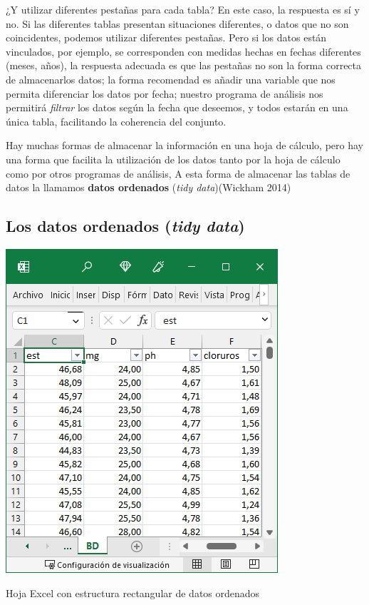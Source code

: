 \documentclass[
  letterpaper,
]{scrbook}
\begin{document}
¿Y utilizar diferentes pestañas para cada tabla? En este caso, la
respuesta es sí y no. Si las diferentes tablas presentan situaciones
diferentes, o datos que no son coincidentes, podemos utilizar diferentes
pestañas. Pero si los datos están vinculados, por ejemplo, se
corresponden con medidas hechas en fechas diferentes (meses, años), la
respuesta adecuada es que las pestañas no son la forma correcta de
almacenarlos datos; la forma recomendad es añadir una variable que nos
permita diferenciar los datos por fecha; nuestro programa de análisis
nos permitirá \emph{filtrar} los datos según la fecha que deseemos, y
todos estarán en una única tabla, facilitando la coherencia del
conjunto.

Hay muchas formas de almacenar la información en una hoja de cálculo,
pero hay una forma que facilita la utilización de los datos tanto por la
hoja de cálculo como por otros programas de análisis, A esta forma de
almacenar las tablas de datos la llamamos \textbf{datos ordenados}
(\emph{tidy data})(Wickham 2014)

\hypertarget{los-datos-ordenados-tidy-data}{%
\subsection{\texorpdfstring{Los datos ordenados (\emph{tidy
data})}{Los datos ordenados (tidy data)}}\label{los-datos-ordenados-tidy-data}}

\begin{marginfigure}

{\centering \includegraphics{./01-imagenes/2023-01-20.png}

}

\caption{Hoja Excel con estructura rectangular de datos ordenados}

\end{marginfigure}
\end{document}
